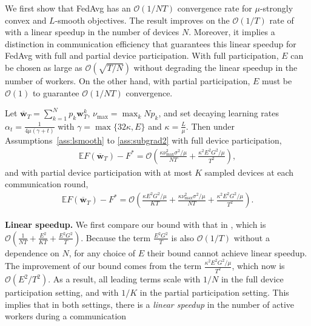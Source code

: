 We first show that FedAvg has an $\mathcal{O}(1/NT)$ convergence rate
for $\mu$-strongly convex and $L$-smooth objectives. The result
improves on the $\mathcal{O}(1/T)$ rate of \cite{li2019convergence}
with a linear speedup in the number of devices $N$. Moreover, it
implies a distinction in communication efficiency that guarantees
this linear speedup for FedAvg with full and partial device participation.
With full participation, $E$ can be chosen as large as $\mathcal{O}(\sqrt{T/N})$
without degrading the linear speedup in the number of workers. On
the other hand, with partial participation, $E$ must be $\mathcal{O}(1)$
to guarantee $\mathcal{O}(1/NT)$ convergence.
\begin{theorem}
	\label{thm:SGD_scvx}Let $\overline{\mathbf{w}}_{T}=\sum_{k=1}^{N}p_{k}\mathbf{w}_{T}^{k}$,
	$\nu_{\max}=\max_{k}Np_{k}$, and set decaying learning rates $\alpha_{t}=\frac{1}{4\mu(\gamma+t)}$
	with $\gamma=\max\{32\kappa,E\}$ and $\kappa=\frac{L}{\mu}$. Then
	under Assumptions~\ref{ass:lsmooth} to \ref{ass:subgrad2} with full device participation, 
	\begin{align*}
	\mathbb{E}F(\overline{\mathbf{w}}_{T})-F^{\ast}=\mathcal{O}\left(\frac{\kappa\nu_{\max}^{2}\sigma^{2}/\mu}{NT}+\frac{\kappa^{2}E^{2}G^{2}/\mu}{T^{2}}\right),
	\end{align*}
	and with partial device participation with at most $K$ sampled devices
	at each communication round, 
	\begin{align*}
	\mathbb{E}F(\overline{\mathbf{w}}_{T})-F^{\ast}=\mathcal{O}\left(\frac{\kappa E^{2}G^{2}/\mu}{KT}+\frac{\kappa\nu_{\max}^{2}\sigma^{2}/\mu}{NT}+\frac{\kappa^{2}E^{2}G^{2}/\mu}{T^{2}}\right).
	\end{align*}
	\label{th:scvx_sgd}
\end{theorem}
%
\textbf{Linear speedup. }We first compare our bound with that in \cite{li2019convergence},
which is $\mathcal{O}(\frac{1}{NT}+\frac{E^{2}}{KT}+\frac{E^{2}G^{2}}{T})$.
Because the term $\frac{E^{2}G^{2}}{T}$ is also $\mathcal{O}(1/T)$
without a dependence on $N$, for any choice of $E$ their bound cannot
achieve linear speedup. The improvement of our bound comes from the
term $\frac{\kappa^{2}E^{2}G^{2}/\mu}{T^{2}}$, which now is $\mathcal{O}(E^{2}/T^{2})$.
As a result, all leading terms scale with $1/N$ in the full device
participation setting, and with $1/K$ in the partial participation
setting. This implies that in both settings, there is a \emph{linear
	speedup} in the number of active workers during a communication
